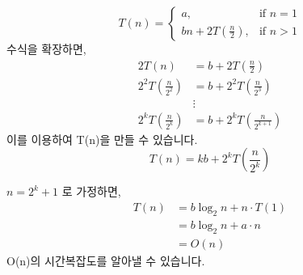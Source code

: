 \documentclass{article}
\begin{document}
\[
T(n) =
\begin{cases}
a, & \text{if } n = 1 \\
bn + 2T\left(\frac{n}{2}\right), & \text{if } n > 1
\end{cases}
\]
\newline
수식을 확장하면,
\[
\begin{aligned}
2T(n) &= b + 2T\left(\frac{n}{2}\right) \\
2^2T\left(\frac{n}{2^2}\right) &= b + 2^2T\left(\frac{n}{2^3}\right) \\
& \vdots \\
2^kT\left(\frac{n}{2^k}\right) &= b + 2^kT\left(\frac{n}{2^{k+1}}\right)
\end{aligned}
\]
이를 이용하여 T(n)을 만들 수 있습니다.
\[
T(n) = k b + 2^kT\left(\frac{n}{2^k}\right)
\]

 $n = 2^k+1$ 로 가정하면,
\[
\begin{aligned}
T(n) &= b \log_2 n + n \cdot T(1) \\
&= b \log_2 n + a \cdot n \\
&= O(n)
\end{aligned}
\]
O(n)의 시간복잡도를 알아낼 수 있습니다.
\end{document}
